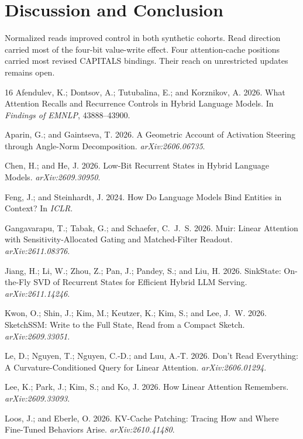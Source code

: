 \documentclass[letterpaper]{article}
\begin{document}
\section{Discussion and Conclusion}
Normalized reads improved control in both synthetic cohorts. Read direction carried most of the four-bit value-write effect. Four attention-cache positions carried most revised CAPITALS bindings. Their reach on unrestricted updates remains open.

\begin{thebibliography}{16}
Afendulev, K.; Dontsov, A.; Tutubalina, E.; and Korznikov, A. 2026.
What Attention Recalls and Recurrence Controls in Hybrid Language Models.
In \emph{Findings of EMNLP}, 43888--43900.


Aparin, G.; and Gaintseva, T. 2026. A Geometric Account of
Activation Steering through Angle-Norm Decomposition.
\emph{arXiv:2606.06735}.

Chen, H.; and He, J. 2026. Low-Bit Recurrent States in Hybrid Language Models. \emph{arXiv:2609.30950}.

Feng, J.; and Steinhardt, J. 2024. How Do Language Models Bind
Entities in Context? In \emph{ICLR}.

Gangavarapu, T.; Tabak, G.; and Schaefer, C.~J.~S. 2026.
Muir: Linear Attention with Sensitivity-Allocated Gating and Matched-Filter
Readout. \emph{arXiv:2611.08376}.

Jiang, H.; Li, W.; Zhou, Z.; Pan, J.; Pandey, S.; and Liu, H. 2026.
SinkState: On-the-Fly SVD of Recurrent States for Efficient Hybrid LLM
Serving. \emph{arXiv:2611.14246}.

Kwon, O.; Shin, J.; Kim, M.; Keutzer, K.; Kim, S.; and Lee, J.~W. 2026. SketchSSM: Write to the Full State, Read from a Compact Sketch. \emph{arXiv:2609.33051}.

Le, D.; Nguyen, T.; Nguyen, C.-D.; and Luu, A.-T. 2026.
Don't Read Everything: A Curvature-Conditioned Query for Linear
Attention. \emph{arXiv:2606.01294}.

Lee, K.; Park, J.; Kim, S.; and Ko, J. 2026.
How Linear Attention Remembers. \emph{arXiv:2609.33093}.

Loos, J.; and Eberle, O. 2026. KV-Cache Patching: Tracing How and
Where Fine-Tuned Behaviors Arise. \emph{arXiv:2610.41480}.


\end{thebibliography}
\end{document}
